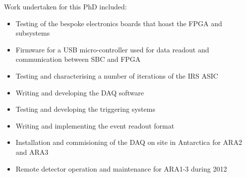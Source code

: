 Work undertaken for this PhD included:

\begin{itemize}
\item Testing of the bespoke electronics boards that hoast the FPGA and subsystems
\item Firmware for a USB micro-controller used for data readout and communication between SBC and FPGA
\item Testing and characterising a number of iterations of the IRS ASIC
\item Writing and developing the DAQ software
\item Testing and developing the triggering systems
\item Writing and implementing the event readout format
\item Installation and commisioning of the DAQ on site in Antarctica for ARA2 and ARA3
\item Remote detector operation and maintenance for ARA1-3 during 2012
\end{itemize}

